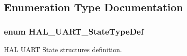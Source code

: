 \subsection{Enumeration Type Documentation}
\subsubsection[{\texorpdfstring{H\+A\+L\+\_\+\+U\+A\+R\+T\+\_\+\+State\+Type\+Def}{HAL_UART_StateTypeDef}}]{\setlength{\rightskip}{0pt plus 5cm}enum {\bf H\+A\+L\+\_\+\+U\+A\+R\+T\+\_\+\+State\+Type\+Def}}\hypertarget{group___u_a_r_t___exported___types_gaf55d844a35379c204c90be5d1e8e50ba}{}\label{group___u_a_r_t___exported___types_gaf55d844a35379c204c90be5d1e8e50ba}


H\+AL U\+A\+RT State structures definition. 

